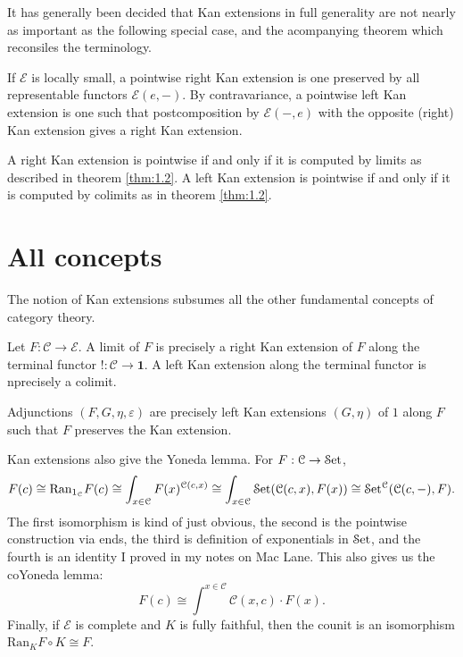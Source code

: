 It has generally been decided that Kan extensions in full generality are not nearly as important as the following special case, and the acompanying theorem which reconsiles the terminology.

\begin{definition}\label{dfn:1.3}
	If $\mathcal{E} $ is locally small, a pointwise right Kan extension is one preserved by all representable functors $\mathcal{E} (e,-)$. By contravariance, a pointwise left Kan extension is one such that postcomposition by $\mathcal{E} (-,e)$ with the opposite (right) Kan extension gives a right Kan extension.
\end{definition}
\begin{theorem}\label{thm:1.3}
	A right Kan extension is pointwise if and only if it is computed by limits as described in theorem \ref{thm:1.2}. A left Kan extension is pointwise if and only if it is computed by colimits as in theorem \ref{thm:1.2}.
\end{theorem}

\section{All concepts}

The notion of Kan extensions subsumes all the other fundamental concepts of category theory.

\begin{theorem}\label{thm:1.4}
	Let $F : \mathcal{C}  \to \mathcal{E} $. A limit of $F$ is precisely a right Kan extension of $F$ along the terminal functor $! : \mathcal{C} \to \mathbf{1} $. A left Kan extension along the terminal functor is nprecisely a colimit.
\end{theorem}
\begin{theorem}\label{thm:1.5}
	Adjunctions $(F,G,\eta,\varepsilon )$ are precisely left Kan extensions $(G,\eta)$ of $1$ along $F$ such that $F$ preserves the Kan extension.
\end{theorem}

Kan extensions also give the Yoneda lemma. For $F : \mathcal{C}  \to \mathcal{S}\mathrm{et} $,
\[
	F(c)\cong \mathrm{Ran} _{1_\mathcal{C} } F(c)\cong \int_{x\in \mathcal{C} } F(x)^{\mathcal{C} (c,x)} \cong \int_{x\in \mathcal{C} } \mathcal{S}\mathrm{et} (\mathcal{C} (c,x),F(x))\cong \mathcal{S}\mathrm{et} ^{\mathcal{C} } (\mathcal{C} (c,-),F)
.\]
The first isomorphism is kind of just obvious, the second is the pointwise construction via ends, the third is definition of exponentials in $\mathcal{S}\mathrm{et} $, and the fourth is an identity I proved in my notes on Mac Lane. This also gives us the coYoneda lemma:
\[
	F(c)\cong \int^{x\in \mathcal{C} } \mathcal{C} (x,c)\cdot F(x)
.\]
Finally, if $\mathcal{E} $ is complete and $K$ is fully faithful, then the counit is an isomorphism $\mathrm{Ran} _KF\circ K\cong F$.

